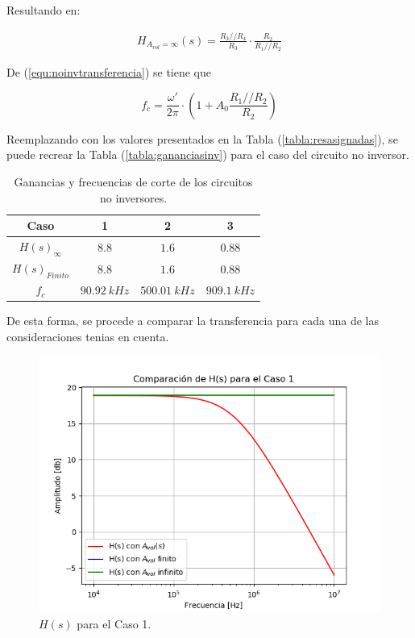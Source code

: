 Resultando en:

\begin{align}
	H_{A_{vol}=\infty} \left(s \right) = \frac{R_3 // R_4}{R_3} \cdot \frac{R_2}{R_1 // R_2}
		\label{equ:noinvtransferencia_ideal}
\end{align}

De (\ref{equ:noinvtransferencia}) se tiene que

\begin{equation}
	f_c = \frac{\omega'}{2 \pi}\cdot \left( 1 + A_{0} \frac{R_1 // R_2}{R_2} \right)
\end{equation}

Reemplazando con los valores presentados en la Tabla (\ref{tabla:resasignadas}), se puede recrear la Tabla (\ref{tabla:gananciasinv}) para el caso del circuito no inversor.

\begin{table}[H]
\begin{center}
\begin{tabular}{|c|c|c|c|}
\hline
\textbf{Caso}            & \textbf{1} & \textbf{2} & \textbf{3} \\ \hline
\textbf{$H(s)_{\infty}$} & $8.8$         & $1.6$          & $0.88$        \\ \hline
\textbf{$H(s)_{Finito}$} & $8.8$     & $1.6$     & $0.88$     \\ \hline
\textbf{$f_c$}           & $90.92 \ kHz$   & $500.01 \ kHz$  & $909.1 \ kHz$     \\ \hline
\end{tabular}
\caption{Ganancias y frecuencias de corte de los circuitos no inversores.}
\end{center}
\end{table}

De esta forma, se procede a comparar la transferencia para cada una de las consideraciones tenias en cuenta.

\begin{figure}[H]	
	\centering
	\includegraphics[width=\textwidth]{Ejercicio1/Imagenes/HCompC1_noinv.png}
	\caption{$H(s)$ para el Caso 1.}
	\label{fig:AvolC1_noinv}
\end{figure}

